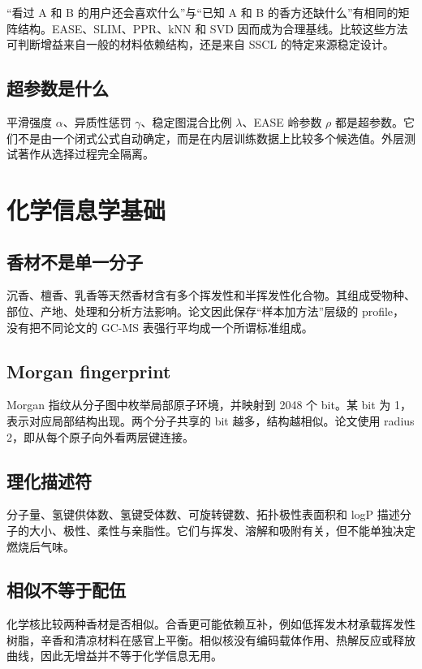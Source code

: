 \documentclass[UTF8,11pt,openany,fontset=none]{ctexbook}
\newcommand{\SSCL}{\textsc{SSCL}}
\begin{document}
“看过 A 和 B 的用户还会喜欢什么”与“已知 A 和 B 的香方还缺什么”有相同的矩阵结构。EASE、SLIM、PPR、kNN 和 SVD 因而成为合理基线。比较这些方法可判断增益来自一般的材料依赖结构，还是来自 \SSCL{} 的特定来源稳定设计。

\section{超参数是什么}

平滑强度 $\alpha$、异质性惩罚 $\gamma$、稳定图混合比例 $\lambda$、EASE 岭参数 $\rho$ 都是超参数。它们不是由一个闭式公式自动确定，而是在内层训练数据上比较多个候选值。外层测试著作从选择过程完全隔离。

\chapter{化学信息学基础}

\section{香材不是单一分子}

沉香、檀香、乳香等天然香材含有多个挥发性和半挥发性化合物。其组成受物种、部位、产地、处理和分析方法影响。论文因此保存“样本加方法”层级的 profile，没有把不同论文的 GC-MS 表强行平均成一个所谓标准组成。

\section{Morgan fingerprint}

Morgan 指纹从分子图中枚举局部原子环境，并映射到 2048 个 bit。某 bit 为 1，表示对应局部结构出现。两个分子共享的 bit 越多，结构越相似。论文使用 radius 2，即从每个原子向外看两层键连接。

\section{理化描述符}

分子量、氢键供体数、氢键受体数、可旋转键数、拓扑极性表面积和 logP 描述分子的大小、极性、柔性与亲脂性。它们与挥发、溶解和吸附有关，但不能单独决定燃烧后气味。

\section{相似不等于配伍}

化学核比较两种香材是否相似。合香更可能依赖互补，例如低挥发木材承载挥发性树脂，辛香和清凉材料在感官上平衡。相似核没有编码载体作用、热解反应或释放曲线，因此无增益并不等于化学信息无用。
\end{document}
